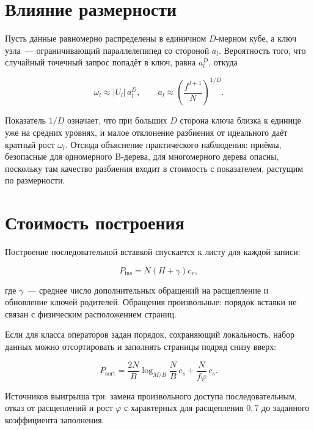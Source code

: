 \section{Влияние размерности}

Пусть данные равномерно распределены в единичном $D$-мерном кубе, а ключ
узла~--- ограничивающий параллелепипед со стороной $a_l$. Вероятность того, что
случайный точечный запрос попадёт в ключ, равна $a_l^D$, откуда

\begin{equation}
\label{eq:curse}
\omega_l \approx |U_l| \, a_l^{D}, \qquad
a_l \approx \left(\frac{f^{\,l+1}}{N}\right)^{1/D} .
\end{equation}

Показатель $1/D$ означает, что при больших $D$ сторона ключа близка к единице
уже на средних уровнях, и малое отклонение разбиения от идеального даёт кратный
рост $\omega_l$. Отсюда объяснение практического наблюдения: приёмы, безопасные
для одномерного B-дерева, для многомерного дерева опасны, поскольку там
качество разбиения входит в стоимость с показателем, растущим по размерности.

\section{Стоимость построения}

Построение последовательной вставкой спускается к листу для каждой записи:

\begin{equation}
\label{eq:build-ins}
P_{\text{ins}} = N\left(H + \gamma\right) c_r ,
\end{equation}

где $\gamma$~--- среднее число дополнительных обращений на расщепление и
обновление ключей родителей. Обращения произвольные: порядок вставки не связан
с физическим расположением страниц.

Если для класса операторов задан порядок, сохраняющий локальность, набор данных
можно отсортировать и заполнять страницы подряд снизу вверх:

\begin{equation}
\label{eq:build-sort}
P_{\text{sort}} = \frac{2N}{B}\log_{M/B}\frac{N}{B}\, c_s
                + \frac{N}{f\varphi}\, c_s .
\end{equation}

Источников выигрыша три: замена произвольного доступа последовательным, отказ
от расщеплений и рост $\varphi$ с характерных для расщепления $0{,}7$ до
заданного коэффициента заполнения.

